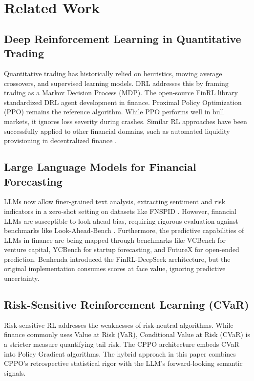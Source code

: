 \documentclass{article}
\begin{document}
\section{Related Work}

\subsection{Deep Reinforcement Learning in Quantitative Trading}

Quantitative trading has historically relied on heuristics, moving average crossovers, and supervised learning models. DRL addresses this by framing trading as a Markov Decision Process (MDP). The open-source FinRL library \cite{liu2020} standardized DRL agent development in finance. Proximal Policy Optimization (PPO) \cite{schulman2017} remains the reference algorithm. While PPO performs well in bull markets, it ignores loss severity during crashes. Similar RL approaches have been successfully applied to other financial domains, such as automated liquidity provisioning in decentralized finance \cite{xu2025}.

\subsection{Large Language Models for Financial Forecasting}

LLMs now allow finer-grained text analysis, extracting sentiment and risk indicators in a zero-shot setting on datasets like FNSPID \cite{dong2024}. However, financial LLMs are susceptible to look-ahead bias, requiring rigorous evaluation against benchmarks like Look-Ahead-Bench \cite{benhenda2026lookaheadbench}. Furthermore, the predictive capabilities of LLMs in finance are being mapped through benchmarks like VCBench \cite{chen2025vcbenchbenchmarkingllmsventure} for venture capital, YCBench \cite{benhenda2026ycbench} for startup forecasting, and FutureX \cite{zeng2025, chandak2026} for open-ended prediction. Benhenda \cite{benhenda2025} introduced the FinRL-DeepSeek architecture, but the original implementation consumes scores at face value, ignoring predictive uncertainty.

\subsection{Risk-Sensitive Reinforcement Learning (CVaR)}

Risk-sensitive RL addresses the weaknesses of risk-neutral algorithms. While finance commonly uses Value at Risk (VaR), Conditional Value at Risk (CVaR) \cite{rockafellar2000} is a stricter measure quantifying tail risk. The CPPO architecture embeds CVaR into Policy Gradient algorithms. The hybrid approach in this paper combines CPPO's retrospective statistical rigor with the LLM's forward-looking semantic signals.
\end{document}
